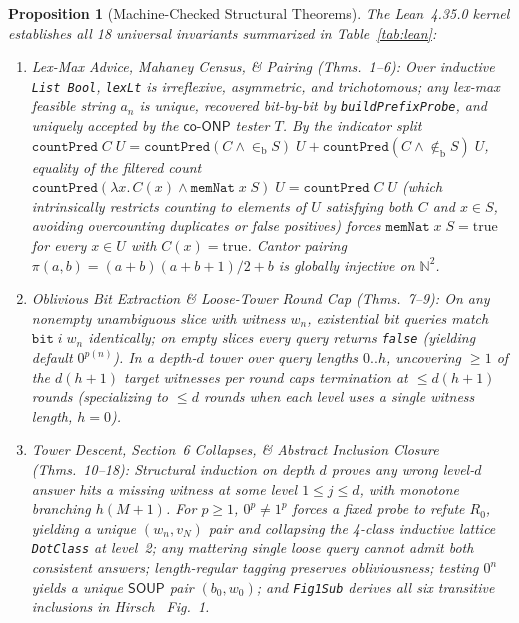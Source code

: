 \documentclass[10pt,twocolumn]{article}
\newtheorem{proposition}{Proposition}
\newcommand{\ONP}{\mathsf{ONP}}
\newcommand{\SOUP}{\mathsf{SOUP}}
\begin{document}
\begin{proposition}[Machine-Checked Structural Theorems]\label{prop:lean}
The Lean~4.35.0 kernel establishes all 18 universal invariants summarized in Table~\ref{tab:lean}:
\begin{enumerate}[leftmargin=*,nosep]
  \item \emph{Lex-Max Advice, Mahaney Census, \& Pairing (Thms.~1--6):} Over inductive \texttt{List Bool}, \texttt{lexLt} is irreflexive, asymmetric, and trichotomous; any lex-max feasible string $a_n$ is unique, recovered bit-by-bit by \texttt{buildPrefixProbe}, and uniquely accepted by the $\mathsf{co}\text{-}\ONP$ tester $T$. By the indicator split $\texttt{countPred}\;C\;U = \texttt{countPred}(C\land \in_{\mathrm{b}} S)\;U + \texttt{countPred}(C\land \notin_{\mathrm{b}} S)\;U$, equality of the filtered count $\texttt{countPred}(\lambda x.\,C(x)\land \texttt{memNat}\;x\;S)\;U = \texttt{countPred}\;C\;U$ (which intrinsically restricts counting to elements of $U$ satisfying both $C$ and $x\in S$, avoiding overcounting duplicates or false positives) forces $\texttt{memNat}\;x\;S = \mathrm{true}$ for every $x \in U$ with $C(x)=\mathrm{true}$. Cantor pairing $\pi(a, b) = (a+b)(a+b+1)/2 + b$ is globally injective on $\mathbb{N}^2$.
  \item \emph{Oblivious Bit Extraction \& Loose-Tower Round Cap (Thms.~7--9):} On any nonempty unambiguous slice with witness $w_n$, existential bit queries match $\texttt{bit}\;i\;w_n$ identically; on empty slices every query returns \texttt{false} (yielding default $0^{p(n)}$). In a depth-$d$ tower over query lengths $0..h$, uncovering $\ge 1$ of the $d(h+1)$ target witnesses per round caps termination at $\le d(h+1)$ rounds (specializing to $\le d$ rounds when each level uses a single witness length, $h=0$).
  \item \emph{Tower Descent, Section~6 Collapses, \& Abstract Inclusion Closure (Thms.~10--18):} Structural induction on depth $d$ proves any wrong level-$d$ answer hits a missing witness at some level $1 \le j \le d$, with monotone branching $h(M+1)$. For $p \ge 1$, $0^p \neq 1^p$ forces a fixed probe to refute $R_0$, yielding a unique $(w_n, v_N)$ pair and collapsing the 4-class inductive lattice \texttt{DotClass} at level~2; any mattering single loose query cannot admit both consistent answers; length-regular tagging preserves obliviousness; testing $0^n$ yields a unique $\SOUP$ pair $(b_0, w_0)$; and \texttt{Fig1Sub} derives all six transitive inclusions in Hirsch~\cite{hirsch2026note} Fig.~1.
\end{enumerate}
\end{proposition}
\end{document}
